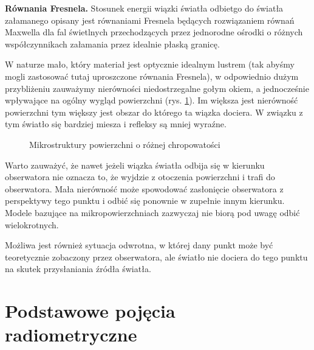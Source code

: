 \documentclass[../main.tex]{subfiles}
\begin{document}
\textbf{Równania Fresnela.}
  Stosunek energii wiązki światła odbietgo do światła załamanego opisany jest
  równaniami Fresnela będących rozwiązaniem równań Maxwella dla fal świetlnych
  przechodzących przez jednorodne ośrodki o różnych współczynnikach załamania
  przez idealnie płaską granicę.

W naturze mało, który materiał jest optycznie idealnym lustrem (tak abyśmy
mogli zastosować tutaj uproszczone równania Fresnela), w odpowiednio dużym
przybliżeniu zauważymy nierówności niedostrzegalne gołym okiem, a jednocześnie
wpływające na ogólny wygląd powierzchni (rys. \ref{fig:Microstructure}). Im
większa jest nierówność powierzchni tym większy jest obszar do którego ta
wiązka dociera. W związku z tym światło się bardziej miesza i refleksy są mniej
wyraźne.

\begin{figure}[ht]
  \centering
  \vspace{0.25cm}
  \caption{Mikrostruktury powierzchni o różnej chropowatości}
	\label{fig:Microstructure}
\end{figure}

Warto zauważyć, że nawet jeżeli wiązka światła odbija się w kierunku
obserwatora nie oznacza to, że wyjdzie z otoczenia powierzchni i trafi do
obserwatora. Mała nierówność może spowodować zasłonięcie obserwatora z
perspektywy tego punktu i odbić się ponownie w zupełnie innym kierunku. Modele
bazujące na mikropowierzchniach zazwyczaj nie biorą pod uwagę odbić
wielokrotnych.

Możliwa jest również sytuacja odwrotna, w której dany punkt może być
teoretycznie zobaczony przez obserwatora, ale światło nie dociera do tego
punktu na skutek przysłaniania źródła światła.

\section{Podstawowe pojęcia radiometryczne}
\end{document}
